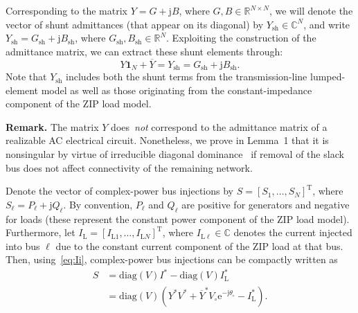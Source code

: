 \documentclass[10 pt, conference]{ieeeconf}
\begin{document}
Corresponding to the matrix $Y = G + \mathrm{j}B$, where $ G, B \in \mathbb{R}^{N\times N}$,  we will denote the vector of shunt admittances (that appear on its diagonal) by $Y_\mathrm{sh} \in \mathbb{C}^N$, and write $Y_\mathrm{sh} = G_\mathrm{sh} + \mathrm j B_\mathrm{sh}$, where $G_\mathrm{sh}, B_\mathrm{sh} \in \mathbb{R}^N$. Exploiting the construction of the admittance matrix, we can extract these shunt elements through:
\begin{equation}
Y \mathbf{1}_N + \overline Y = Y_\mathrm{sh} = G_\mathrm{sh} + \mathrm j B_\mathrm{sh}.
\label{eq:Ysh}
\end{equation}
Note that $Y_\mathrm{sh}$ includes both the shunt terms from the transmission-line lumped-element model as well as those originating from the constant-impedance component of the $\mathrm{ZIP}$ load model. 

\noindent \textbf{Remark.} The matrix $Y$ does~\emph{not} correspond to the admittance matrix of a realizable AC electrical circuit. Nonetheless, we prove in Lemma~1 that it is nonsingular by virtue of irreducible diagonal dominance~\cite{Horn:2013} if removal of the slack bus does not affect connectivity of the remaining network.

Denote the vector of complex-power bus injections by $S = [S_1, \dots, S_{N}]^\mathrm T$, where $S_\ell = P_\ell + \mathrm j Q_\ell$. By convention, $P_\ell$ and $Q_\ell$ are positive for generators and negative for loads (these represent the constant power component of the $\mathrm{ZIP}$ load model). Furthermore, let $I_\mathrm{L} = [I_{\mathrm{L}1}, \dots, I_{\mathrm{L}N}]^\mathrm{T}$, where $I_{\mathrm{L}\ell} \in \mathbb{C}$ denotes the current injected into bus $\ell$ due to the constant current component of the $\mathrm{ZIP}$ load at that bus.  Then, using~\eqref{eq:Ii}, complex-power bus injections can be compactly written as
\begin{align}
S  &=  \mathrm{diag}\left(V\right) I^* -\mathrm{diag}\left(V\right) I_\mathrm{L}^* \nonumber \\
   &= \mathrm{diag}\left(V\right) \left(Y^* V^* + \overline{Y}^* V_\circ \mathrm{e}^{-\mathrm j \theta_\circ}   -  I_\mathrm{L}^* \right).
\label{eq:S}
\end{align}
\end{document}
